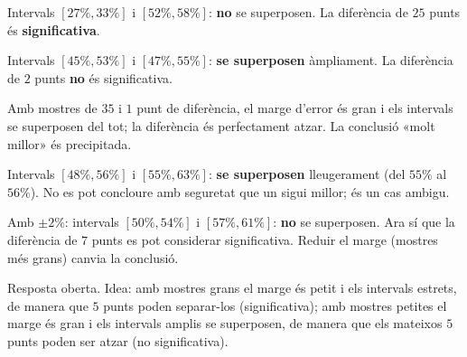 \begin{solucions}
\begin{sollist}
  \item Intervals $[27\%,33\%]$ i $[52\%,58\%]$: \textbf{no} se superposen. La diferència
        de $25$ punts és \textbf{significativa}.
  \item Intervals $[45\%,53\%]$ i $[47\%,55\%]$: \textbf{se superposen} àmpliament. La
        diferència de $2$ punts \textbf{no} és significativa.
  \item Amb mostres de $35$ i $1$ punt de diferència, el marge d'error és gran i els
        intervals se superposen del tot; la diferència és perfectament atzar. La conclusió
        «molt millor» és precipitada.
  \item Intervals $[48\%,56\%]$ i $[55\%,63\%]$: \textbf{se superposen} lleugerament (del
        $55\%$ al $56\%$). No es pot concloure amb seguretat que un sigui millor; és un cas
        ambigu.
  \item Amb $\pm 2\%$: intervals $[50\%,54\%]$ i $[57\%,61\%]$: \textbf{no} se superposen.
        Ara sí que la diferència de $7$ punts es pot considerar significativa. Reduir el
        marge (mostres més grans) canvia la conclusió.
  \item Resposta oberta. Idea: amb mostres grans el marge és petit i els intervals estrets,
        de manera que $5$ punts poden separar-los (significativa); amb mostres petites el
        marge és gran i els intervals amplis se superposen, de manera que els mateixos $5$
        punts poden ser atzar (no significativa).
\end{sollist}
\end{solucions}
